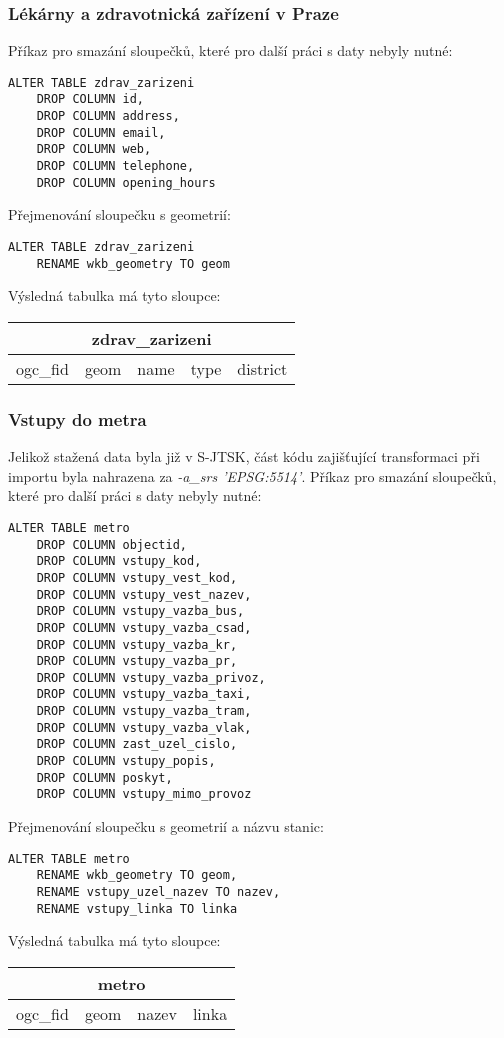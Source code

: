 \documentclass[a4paper, 12pt]{article}
\begin{document}
\subsubsection*{Lékárny a zdravotnická zařízení v Praze}
Příkaz pro smazání sloupečků, které pro další práci s daty nebyly nutné:
\begin{lstlisting}
ALTER TABLE zdrav_zarizeni
    DROP COLUMN id,
    DROP COLUMN address,
    DROP COLUMN email,
    DROP COLUMN web,
    DROP COLUMN telephone,
    DROP COLUMN opening_hours
\end{lstlisting}
Přejmenování sloupečku s geometrií:
\begin{lstlisting}
ALTER TABLE zdrav_zarizeni
    RENAME wkb_geometry TO geom
\end{lstlisting} 
Výsledná tabulka má tyto sloupce:
\begin{table}[h!]
\centering
\begin{tabular}{|c|c|c|c|c|}
\hline
\multicolumn{5}{|c|}{\textbf{zdrav\_zarizeni}} \\ \hline
ogc\_fid   & geom  & name  & type  & district  \\ \hline
\end{tabular}
\end{table}

\subsubsection*{Vstupy do metra}
Jelikož stažená data byla již v S-JTSK, část kódu zajišťující transformaci při importu byla nahrazena za \textsl{-a\_srs 'EPSG:5514'}. Příkaz pro smazání sloupečků, které pro další práci s daty nebyly nutné:
\begin{lstlisting}
ALTER TABLE metro
    DROP COLUMN objectid,
    DROP COLUMN vstupy_kod,
    DROP COLUMN vstupy_vest_kod,
    DROP COLUMN vstupy_vest_nazev,
    DROP COLUMN vstupy_vazba_bus,
    DROP COLUMN vstupy_vazba_csad,
    DROP COLUMN vstupy_vazba_kr,
    DROP COLUMN vstupy_vazba_pr,
    DROP COLUMN vstupy_vazba_privoz,
    DROP COLUMN vstupy_vazba_taxi,
    DROP COLUMN vstupy_vazba_tram,
    DROP COLUMN vstupy_vazba_vlak,
    DROP COLUMN zast_uzel_cislo,
    DROP COLUMN vstupy_popis,
    DROP COLUMN poskyt,
    DROP COLUMN vstupy_mimo_provoz
\end{lstlisting}
Přejmenování sloupečku s geometrií a názvu stanic:
\begin{lstlisting}
ALTER TABLE metro
    RENAME wkb_geometry TO geom,
    RENAME vstupy_uzel_nazev TO nazev,
    RENAME vstupy_linka TO linka
\end{lstlisting} 
Výsledná tabulka má tyto sloupce:
\begin{table}[h!]
\centering
\begin{tabular}{|c|c|c|c|}
\hline
\multicolumn{4}{|c|}{\textbf{metro}} \\ \hline
ogc\_fid      & geom     & nazev     & linka     \\ \hline
\end{tabular}
\end{table}
\end{document}
